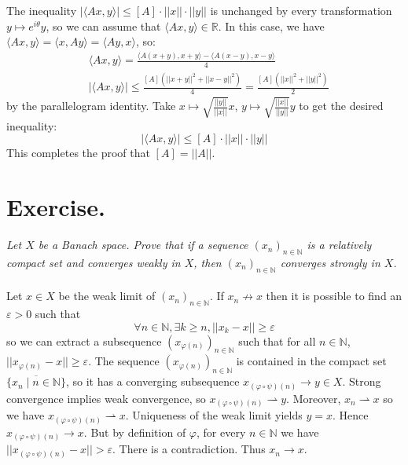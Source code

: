 \documentclass[11pt,a4paper]{article}
\newcommand{\ph}{\varphi}
\newcommand{\il}{\textit}
\newcommand{\N}{\mathbb{N}}
\newcommand{\R}{\mathbb{R}}
\newcommand{\1}{\mathbbm{1}}
\begin{document}
The inequality $|\langle Ax , y \rangle| \leq [A] \cdot ||x|| \cdot ||y||$ is unchanged by every transformation $y \mapsto e^{i\theta} y$, so we can assume that $\langle Ax , y \rangle \in \R$. In this case, we have $\langle Ax , y \rangle = \langle x , Ay \rangle = \langle Ay , x \rangle$, so:
\begin{align*} & \langle Ax , y \rangle = \frac{\langle A(x+y) , x+y \rangle - \langle A(x-y) , x-y \rangle}{4} \\
& |\langle Ax , y \rangle| \leq \frac{[A]\left(||x+y||^2 + ||x-y||^2 \right)}{4} = \frac{[A]\left(||x||^2 + ||y||^2 \right)}{2}
\end{align*}
by the parallelogram identity. Take $x \mapsto \sqrt{\frac{||y||}{||x||}} x$, $y \mapsto \sqrt{\frac{||x||}{||y||}} y$ to get the  desired inequality:
\[ |\langle Ax , y \rangle| \leq [A] \cdot ||x|| \cdot ||y|| \]
This completes the proof that $[A] = ||A||$.
\newpage
\section*{Exercise.}
\il{Let $X$ be a Banach space. Prove that if a sequence $(x_n)_{n\in\N}$ is a relatively compact set and converges weakly in $X$, then $(x_n)_{n\in\N}$ converges strongly in $X$.}\\\\
Let $x \in X$ be the weak limit of $(x_n)_{n\in\N}$. If $x_n \not\to x$ then it is possible to find an $\varepsilon > 0$ such that
\[ \forall n \in \N , \exists k \geq n , ||x_k-x|| \geq \varepsilon \]
so we can extract a subsequence $(x_{\ph(n)})_{n\in\N}$ such that for all $n \in \N$, $||x_{\ph(n)} - x|| \geq \varepsilon$. The sequence $(x_{\ph(n)})_{n\in\N}$ is contained in the compact set $\overline{\{x_n\mid n \in \N\}}$, so it has a converging subsequence $x_{(\ph \circ \psi)(n)}\to y \in X$. Strong convergence implies weak convergence, so $x_{(\ph \circ \psi)(n)} \rightharpoonup y$. Moreover, $x_n \rightharpoonup x$ so we have $x_{(\ph \circ \psi)(n)} \rightharpoonup x$. Uniqueness of the weak limit yields $y = x$. Hence $x_{(\ph \circ \psi)(n)} \to x$. But by definition of $\ph$, for every $n \in \N$ we have $||x_{(\ph\circ\psi)(n)} - x|| > \varepsilon$. There is a contradiction. Thus $x_n \to x$.
\end{document}
